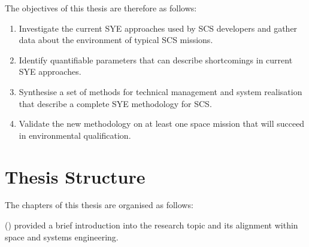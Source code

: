\documentclass[a4paper,nobib,justified,final]{tufte-book}
\begin{document}
\begin{fullwidth}
%
\end{fullwidth}


The objectives of this thesis are therefore as follows:
\begin{enumerate}
	\item Investigate the current \ac{SYE} approaches used by \ac{SCS} developers and gather data about the environment of typical \ac{SCS} missions.
	\item Identify quantifiable parameters that can describe shortcomings in current \ac{SYE} approaches.
	\item Synthesise a set of methods for technical management and system realisation that describe a complete \ac{SYE} methodology for \ac{SCS}.
	\item Validate the new methodology on at least one space mission that will succeed in environmental qualification.
\end{enumerate}

\FloatBarrier
\section{Thesis Structure}
\label{sec:INTRODUCTION_structure}

The chapters of this thesis are organised as follows:

 () provided a brief introduction into the research topic and its alignment within space and systems engineering.
\end{document}
